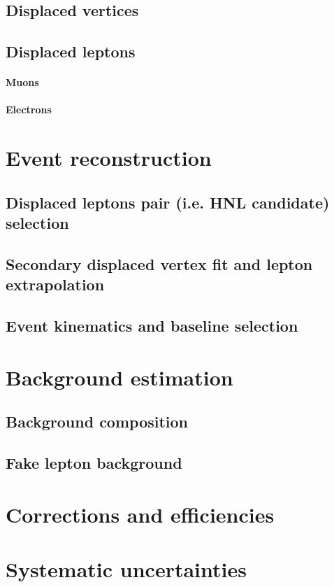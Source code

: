 \subsection{Displaced vertices}
\subsection{Displaced leptons}
\paragraph {Muons}
\paragraph {Electrons}

\section{Event reconstruction}
\subsection{Displaced leptons pair (i.e. HNL candidate) selection}
\subsection{Secondary displaced vertex fit and lepton extrapolation}
\subsection{Event kinematics and baseline selection}

\section{Background estimation}
\subsection{Background composition}
\subsection{Fake lepton background}

\section{Corrections and efficiencies}
\section{Systematic uncertainties}
